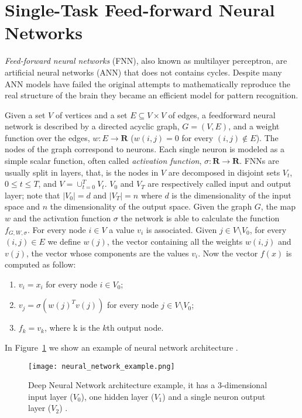 \section{Single-Task Feed-forward Neural Networks} \label{sec:singletaskNN}
\emph{Feed-forward neural networks} (FNN), also known as multilayer perceptron, are artificial neural networks (ANN) that does not contains cycles. Despite many ANN models have failed the original attempts to mathematically reproduce the real structure of the brain they became an efficient model for pattern recognition. 

Given a set $V$ of vertices and a set  $E\subseteq V\times V$ of edges, a feedforward neural network is described by a directed acyclic graph, $G =
(V,E)$, and a weight function over the edges, $w : E \to \mathbf R$ ($w(i, j) = 0$
for every $(i, j) \notin E$). The nodes of the graph correspond to neurons. Each
single neuron is modeled as a simple scalar function, often called \emph{activation function},  $ \sigma : \mathbf R \to
\mathbf R$. FNNs are usually
split in layers, that, is the nodes in $V$ are decomposed in disjoint sets $V_t$, $0\leq t\leq T$,
and $V = \cup_{t = 0}^T V_t$. $V_0$ and
$V_T$ are respectively called input and output layer; note that $|V_0| = d$ and
$|V_T| = n$ where $d$ is the dimensionality of the input space and $n$ the
dimensionality of the output space. Given the graph $G$, the map $w$ and the
activation function $\sigma$ the network is able to calculate the function
$f_{G,W,\sigma}$. For every node $i \in V$ a value $v_i$ is associated. Given $j
\in V \setminus V_0$, for every $(i, j) \in E$ we define $w(j)$, the vector containing all
the weights $w(i, j)$ and $v(j)$, the vector whose components are the values $v_i$. Now the
vector $f(x)$ is computed as follow:
\begin{enumerate}
    \item $v_i = x_i$ for every node $i \in V_0$;
    \item $v_j = \sigma(w(j)^T v(j))$ for every node $j \in V \setminus V_0$;
    \item $f_k = v_k$, where k is the $k$th output node.
\end{enumerate}
In Figure~\ref{fig:neural_network_example} we show an example of neural network architecture \cite{ShwartzUnderstadningML, BishopML}.
\begin{figure}[ht]
\texttt{[image: neural\_network\_example.png]}
\caption{Deep Neural Network architecture example, it has a 3-dimensional input layer
($V_0$), one hidden layer ($V_1$) and a single neuron output layer ($V_2$)
\cite{ShwartzUnderstadningML}.} 
\label{fig:neural_network_example}
\end{figure}

